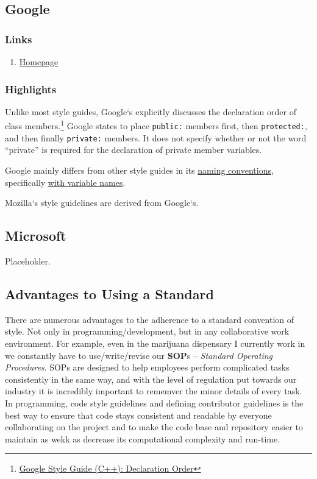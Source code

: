 \documentclass[12pt]{report}
\theoremstyle{definition}
\theoremstyle{plain}
\theoremstyle{plain}
\begin{document}
        \subsection{Google}
          \subsubsection{Links}
            \begin{enumerate}
                \item \href{https://google.github.io/styleguide/cppguide.html}{Homepage}
            \end{enumerate}
          \subsubsection{Highlights}
            Unlike most style guides, Google`s explicitly discusses the declaration order
              of class members.\footnote{\href{https://google.github.io/styleguide/cppguide.html\#Declaration_Order}{Google Style Guide (C++): Declaration Order}}
              Google states to place \texttt{public:} members first, then \texttt{protected:}, and then
              finally \texttt{private:} members. It does not specify whether or not the word ``private''
              is required for the declaration of private member variables.
              
            Google mainly differs from other style guides in its \href{https://google.github.io/styleguide/cppguide.html\#Naming}{naming conventions}, specifically
              \href{https://google.github.io/styleguide/cppguide.html#Variable_Names}{with variable names}.
              
            Mozilla`s style guidelines are derived from Google`s.

        \subsection{Microsoft} 
          Placeholder.
        
        \subsection{Advantages to Using a Standard}
          There are numerous advantages to the adherence to a standard convention of style.
            Not only in programming/development, but in any collaborative work environment.
            For example, even in the marijuana dispensary I currently work in we constantly
            have to use/write/revise our \textbf{SOP}s -- \textit{Standard Operating Procedures}.
            SOPs are designed to help employees perform complicated tasks consistently in the
            same way, and with the level of regulation put towards our industry it is incredibly
            important to rememver the minor details of every task. In programming, code style
            guidelines and defining contributor guidelines is the best way to ensure that
            code stays consistent and readable by everyone collaborating on the project and to make
            the code base and repository easier to maintain as wekk as decrease its
            computational complexity and run-time.




  \newpage
  \nocite{*}
  \printbibliography[
    heading=bibintoc,
    title={Bibliography}
  ]
\end{document}
